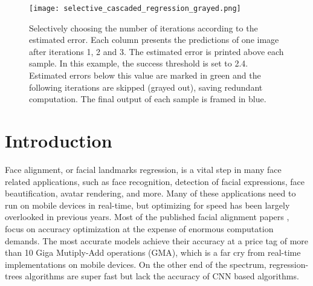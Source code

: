 \documentclass[9pt,twocolumn]{extarticle}
\begin{document}
\begin{figure}[H]
\texttt{[image: selective\_cascaded\_regression\_grayed.png]}
\caption{Selectively choosing the number of iterations according to the estimated error. Each column presents the predictions of one image after iterations 1, 2 and 3. The estimated error is printed above each sample. In this example, the success threshold is set to 2.4. Estimated errors below this value are marked in green and the following iterations are skipped (grayed out), saving redundant computation. The final output of each sample is framed in blue.}
\label{fig:selective_iterations}
\end{figure}


\section{Introduction}
Face alignment, or facial landmarks regression, is a vital step in many face related applications, such as face recognition, detection of facial expressions, face beautification, avatar rendering, and more. Many of these applications need to run on mobile devices in real-time, but optimizing for speed has been largely overlooked in previous years. Most of the published facial alignment papers \cite{zheng2020hafanet,wu2018look,chen2019face, wang2020deep}, focus on accuracy optimization at the expense of enormous computation demands. The most accurate models achieve their accuracy at a price tag of more than 10 Giga Mutiply-Add operations (GMA), which is a far cry from real-time implementations on mobile devices. On the other end of the spectrum, regression-trees algorithms \cite{kazemi2014one, lee2015face} are super fast but lack the accuracy of CNN based algorithms.
\end{document}
